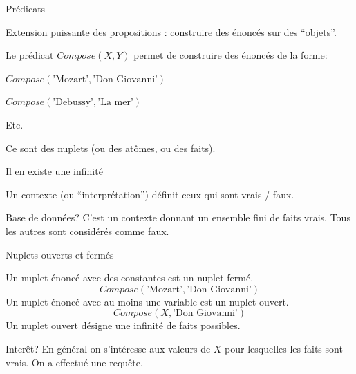 \begin{frame}{Prédicats}

Extension puissante des propositions : \alert{construire des énoncés sur des ``objets''}.

\vfill

Le prédicat $Compose (X, Y)$ permet de construire des énoncés de la forme:

\begin{redbullet}
   \item $Compose  (\text{'Mozart'}, \text{'Don Giovanni'})$
   \item $Compose  (\text{'Debussy'}, \text{'La mer'})$
  \item  Etc.
\end{redbullet}

\vfill

Ce sont des nuplets (ou des atômes, ou des faits). 

\begin{redbullet}
   \item Il en existe une infinité
   \item Un \alert{contexte} (ou ``interprétation'') définit ceux qui sont vrais / faux.
\end{redbullet}

\vfill

\begin{blocgauche}
\begin{remblock}{Base de données?}
C'est un contexte donnant un ensemble fini de faits vrais. Tous les autres sont considérés comme faux.
\end{remblock}
\end{blocgauche}

\end{frame}




\begin{frame}{Nuplets ouverts et fermés}

Un nuplet énoncé avec des constantes est un nuplet \alert{fermé}. 
$$Compose  (\text{'Mozart'}, \text{'Don Giovanni'})$$
\vfill
Un nuplet énoncé avec au moins une variable est un nuplet \alert{ouvert}. 
$$Compose  (X, \text{'Don Giovanni'})$$
\vfill
Un nuplet ouvert désigne une infinité de faits possibles. 

\vfill


\begin{blocgauche}
\begin{remblock}{Interêt?}
En général on s'intéresse aux valeurs de $X$ pour lesquelles les faits sont vrais.
\alert{On a effectué une requête}.
\end{remblock}
\end{blocgauche}


\end{frame}




